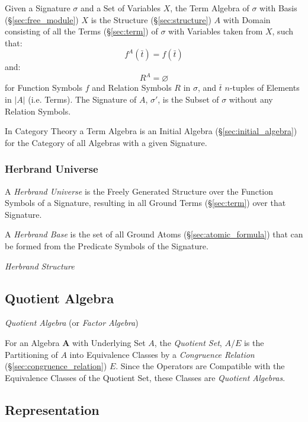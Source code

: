 Given a Signature $\sigma$ and a Set of Variables $X$, the Term
Algebra of $\sigma$ with Basis (\S\ref{sec:free_module}) $X$ is the
Structure (\S\ref{sec:structure}) $A$ with Domain consisting of all
the Terms (\S\ref{sec:term}) of $\sigma$ with Variables taken from
$X$, such that:
\[
  f^A(\bar{t}) = f(\bar{t})
\] and: \[
  R^A = \varnothing
\]
for Function Symbols $f$ and Relation Symbols $R$ in $\sigma$, and
$\bar{t}$ $n$-tuples of Elements in $|A|$ (i.e. Terms). The Signature
of $A$, $\sigma'$, is the Subset of $\sigma$ without any Relation
Symbols.

In Category Theory a Term Algebra is an Initial Algebra
(\S\ref{sec:initial_algebra}) for the Category of all Algebras with a
given Signature.



\subsubsection{Herbrand Universe}\label{sec:herbrand_universe}

A \emph{Herbrand Universe} is the Freely Generated Structure over the
Function Symbols of a Signature, resulting in all Ground Terms
(\S\ref{sec:term}) over that Signature.

A \emph{Herbrand Base} is the set of all Ground Atoms
(\S\ref{sec:atomic_formula}) that can be formed from the Predicate
Symbols of the Signature.

\emph{Herbrand Structure}



\subsection{Quotient Algebra}\label{sec:quotient_algebra}

\emph{Quotient Algebra} (or \emph{Factor Algebra})

For an Algebra $\mathbf{A}$ with Underlying Set $A$, the
\emph{Quotient Set}, $A / E$ is the Partitioning of $A$ into
Equivalence Classes by a \emph{Congruence Relation}
(\S\ref{sec:congruence_relation}) $E$. Since the Operators are
Compatible with the Equivalence Classes of the Quotient Set, these
Classes are \emph{Quotient Algebras}.



\subsection{Representation}\label{sec:model_representation}

